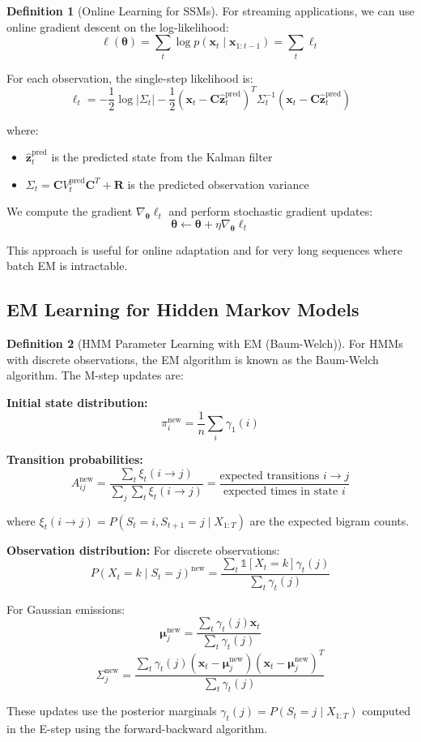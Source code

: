 \documentclass[12pt,a4paper]{article}
\theoremstyle{definition}
\newtheorem{definition}{Definition}[section]
\begin{document}
\begin{definition}[Online Learning for SSMs]
For streaming applications, we can use online gradient descent on the log-likelihood:
\[
\ell(\boldsymbol{\theta}) = \sum_t \log p(\mathbf{x}_t \mid \mathbf{x}_{1:t-1}) = \sum_t \ell_t
\]

For each observation, the single-step likelihood is:
\[
\ell_t = -\frac{1}{2} \log |\Sigma_t| - \frac{1}{2} (\mathbf{x}_t - \mathbf{C} \hat{\mathbf{z}}_t^{\text{pred}})^T \Sigma_t^{-1} (\mathbf{x}_t - \mathbf{C} \hat{\mathbf{z}}_t^{\text{pred}})
\]

where:
\begin{itemize}
    \item $\hat{\mathbf{z}}_t^{\text{pred}}$ is the predicted state from the Kalman filter
    \item $\Sigma_t = \mathbf{C} V_t^{\text{pred}} \mathbf{C}^T + \mathbf{R}$ is the predicted observation variance
\end{itemize}

We compute the gradient $\nabla_{\boldsymbol{\theta}} \ell_t$ and perform stochastic gradient updates:
\[
\boldsymbol{\theta} \leftarrow \boldsymbol{\theta} + \eta \nabla_{\boldsymbol{\theta}} \ell_t
\]

This approach is useful for online adaptation and for very long sequences where batch EM is intractable.
\end{definition}

\subsection{EM Learning for Hidden Markov Models}

\begin{definition}[HMM Parameter Learning with EM (Baum-Welch)]
For HMMs with discrete observations, the EM algorithm is known as the Baum-Welch algorithm. The M-step updates are:

\textbf{Initial state distribution:}
\[
\pi_i^{\text{new}} = \frac{1}{n} \sum_i \gamma_1(i)
\]

\textbf{Transition probabilities:}
\[
A_{ij}^{\text{new}} = \frac{\sum_t \xi_t(i \to j)}{\sum_j \sum_t \xi_t(i \to j)} = \frac{\text{expected transitions } i \to j}{\text{expected times in state } i}
\]

where $\xi_t(i \to j) = P(S_t = i, S_{t+1} = j \mid X_{1:T})$ are the expected bigram counts.

\textbf{Observation distribution:}
For discrete observations:
\[
P(X_t = k \mid S_t = j)^{\text{new}} = \frac{\sum_t \mathbb{1}[X_t = k] \gamma_t(j)}{\sum_t \gamma_t(j)}
\]

For Gaussian emissions:
\[
\boldsymbol{\mu}_j^{\text{new}} = \frac{\sum_t \gamma_t(j) \mathbf{x}_t}{\sum_t \gamma_t(j)}
\]
\[
\Sigma_j^{\text{new}} = \frac{\sum_t \gamma_t(j) (\mathbf{x}_t - \boldsymbol{\mu}_j^{\text{new}}) (\mathbf{x}_t - \boldsymbol{\mu}_j^{\text{new}})^T}{\sum_t \gamma_t(j)}
\]

These updates use the posterior marginals $\gamma_t(j) = P(S_t = j \mid X_{1:T})$ computed in the E-step using the forward-backward algorithm.
\end{definition}
\end{document}
